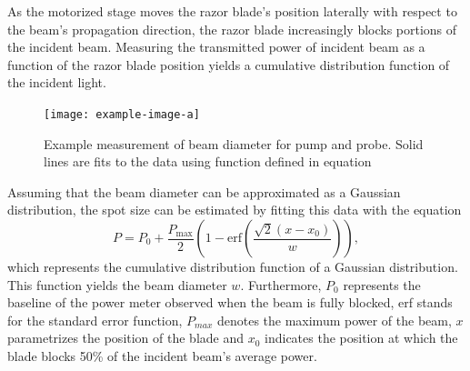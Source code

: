 As the motorized stage moves the razor blade's position laterally with respect to the beam's propagation direction, the razor blade increasingly blocks portions of the incident beam.  Measuring the transmitted power of incident beam as a function of the razor blade position yields a cumulative distribution function of the incident light.

\begin{figure}[h]
	\centering
	\texttt{[image: example-image-a]}
	\caption{Example measurement of beam diameter for pump and probe. Solid lines are fits to the data using function defined in equation}
	\label{fig:beam_diamter_measurement}
\end{figure}

Assuming that the beam diameter can be approximated as a Gaussian distribution, the spot size can be estimated by fitting this data with the equation 
\begin{equation}
	P = P_0 + \dfrac{P_{\mathrm{max}}}{2} \left( 1 - \mathrm{erf} \left( \dfrac{\sqrt{2}(x - x_0)}{w} \right) \right),
\end{equation}
which represents the cumulative distribution function of a Gaussian distribution. This function yields the beam diameter $w$. Furthermore, $P_0$ represents the baseline of the power meter observed when the beam is fully blocked, erf stands for the standard error function, $P_{max}$ denotes the maximum power of the beam, $x$ parametrizes the position of the blade and $x_0$ indicates the position at which the blade blocks 50\% of the incident beam's average power.  








